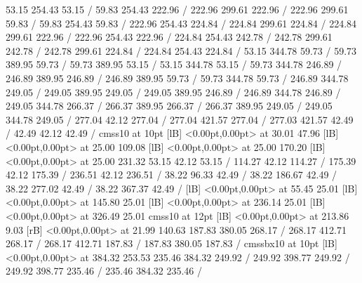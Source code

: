 { 53.15 254.43 53.15 /
\setsolid
{} 59.83 254.43 222.96 /
 222.96 299.61 222.96 /
 222.96 299.61 59.83 /
 59.83 254.43 59.83 /
\setsolid
{} 222.96 254.43 224.84 /
 224.84 299.61 224.84 /
 224.84 299.61 222.96 /
 222.96 254.43 222.96 /
\setsolid
{} 224.84 254.43 242.78 /
 242.78 299.61 242.78 /
 242.78 299.61 224.84 /
 224.84 254.43 224.84 /
\setsolid
{} 53.15 344.78 59.73 /
 59.73 389.95 59.73 /
 59.73 389.95 53.15 /
 53.15 344.78 53.15 /
\setsolid
{} 59.73 344.78 246.89 /
 246.89 389.95 246.89 /
 246.89 389.95 59.73 /
 59.73 344.78 59.73 /
\setsolid
{} 246.89 344.78 249.05 /
 249.05 389.95 249.05 /
 249.05 389.95 246.89 /
 246.89 344.78 246.89 /
\setsolid
{} 249.05 344.78 266.37 /
 266.37 389.95 266.37 /
 266.37 389.95 249.05 /
 249.05 344.78 249.05 /
\setsolid
{} 277.04 42.12 277.04 /
 277.04 421.57 277.04 /
 277.03 421.57 42.49 /
 42.49 42.12 42.49 /
\font\picfont cmss10 at 10pt\picfont
{}  [lB] <0.00pt,0.00pt> at 30.01 47.96
  [lB] <0.00pt,0.00pt> at 25.00 109.08
  [lB] <0.00pt,0.00pt> at 25.00 170.20
  [lB] <0.00pt,0.00pt> at 25.00 231.32
\setsolid
{} 53.15 42.12 53.15 /
\setsolid
{} 114.27 42.12 114.27 /
\setsolid
{} 175.39 42.12 175.39 /
\setsolid
{} 236.51 42.12 236.51 /
\setsolid
{} 38.22 96.33 42.49 /
\setsolid
{} 38.22 186.67 42.49 /
\setsolid
{} 38.22 277.02 42.49 /
\setsolid
{} 38.22 367.37 42.49 /
  [lB] <0.00pt,0.00pt> at 55.45 25.01
  [lB] <0.00pt,0.00pt> at 145.80 25.01
  [lB] <0.00pt,0.00pt> at 236.14 25.01
  [lB] <0.00pt,0.00pt> at 326.49 25.01
\font\picfont cmss10 at 12pt\picfont
{}  [lB] <0.00pt,0.00pt> at 213.86 9.03
 [rB] <0.00pt,0.00pt> at 21.99 140.63
\setsolid
{} 187.83 380.05 268.17 /
 268.17 412.71 268.17 /
 268.17 412.71 187.83 /
 187.83 380.05 187.83 /
\font\picfont cmssbx10 at 10pt\picfont
{}  [lB] <0.00pt,0.00pt> at 384.32 253.53
\setsolid
{} 235.46 384.32 249.92 /
 249.92 398.77 249.92 /
 249.92 398.77 235.46 /
 235.46 384.32 235.46 /
}
